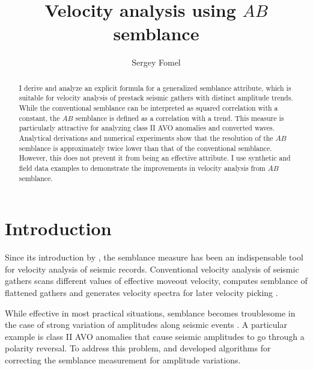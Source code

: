 \title{Velocity analysis using $AB$ semblance}
\author{Sergey Fomel}

\address{Bureau of Economic Geology, \\
John A. and Katherine G. Jackson School of Geosciences \\
The University of Texas at Austin \\
University Station, Box X \\
Austin, TX 78713-8972}



\maketitle

\begin{abstract}
  I derive and analyze an explicit formula for a generalized semblance
  attribute, which is suitable for velocity analysis of prestack
  seismic gathers with distinct amplitude trends. While the
  conventional semblance can be interpreted as squared correlation
  with a constant, the $AB$ semblance is defined as a correlation with a
  trend.  This measure is particularly attractive for analyzing class
  II AVO anomalies and converted waves. Analytical derivations and
  numerical experiments show that the resolution of the $AB$ semblance
  is approximately twice lower than that of the conventional
  semblance. However, this does not prevent it from being an effective
  attribute. I use synthetic and field data examples to demonstrate
  the improvements in velocity analysis from $AB$ semblance.
\end{abstract}

\section{Introduction}

Since its introduction by \cite{GEO34-06-08590881}, the semblance
measure has been an indispensable tool for velocity analysis of
seismic records. Conventional velocity analysis of seismic gathers
scans different values of effective moveout velocity, computes
semblance of flattened gathers and generates velocity spectra for
later velocity picking \cite[]{yilmaz} .

While effective in most practical situations, semblance becomes
troublesome in the case of strong variation of amplitudes along
seismic events \cite[]{GEO66-04-12841293}. A particular example is
class II AVO anomalies \cite[]{GEO54-06-06800688} that cause seismic
amplitudes to go through a polarity reversal. To address this
problem, \cite{SEG-2000-02320235} and
\cite{GEO66-04-12841293,GEO67-05-16641672} developed 
algorithms for correcting the semblance measurement for amplitude
variations.

